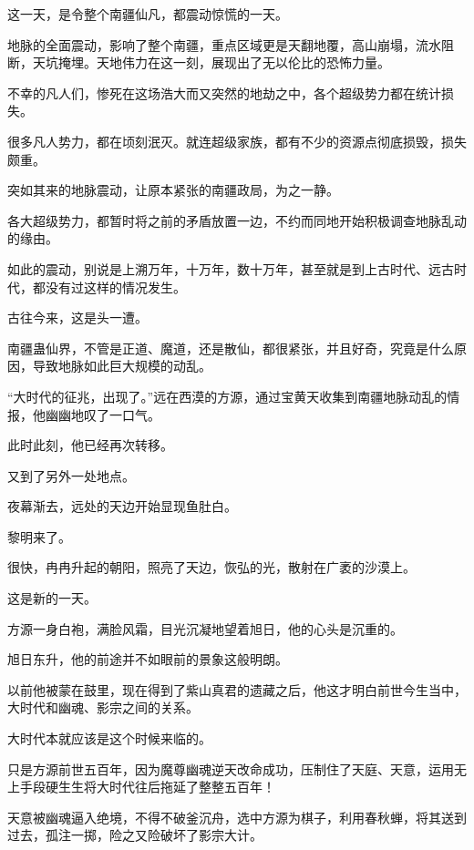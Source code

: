 
\begin{this_body}

这一天，是令整个南疆仙凡，都震动惊慌的一天。

地脉的全面震动，影响了整个南疆，重点区域更是天翻地覆，高山崩塌，流水阻断，天坑掩埋。天地伟力在这一刻，展现出了无以伦比的恐怖力量。

不幸的凡人们，惨死在这场浩大而又突然的地劫之中，各个超级势力都在统计损失。

很多凡人势力，都在顷刻泯灭。就连超级家族，都有不少的资源点彻底损毁，损失颇重。

突如其来的地脉震动，让原本紧张的南疆政局，为之一静。

各大超级势力，都暂时将之前的矛盾放置一边，不约而同地开始积极调查地脉乱动的缘由。

如此的震动，别说是上溯万年，十万年，数十万年，甚至就是到上古时代、远古时代，都没有过这样的情况发生。

古往今来，这是头一遭。

南疆蛊仙界，不管是正道、魔道，还是散仙，都很紧张，并且好奇，究竟是什么原因，导致地脉如此巨大规模的动乱。

“大时代的征兆，出现了。”远在西漠的方源，通过宝黄天收集到南疆地脉动乱的情报，他幽幽地叹了一口气。

此时此刻，他已经再次转移。

又到了另外一处地点。

夜幕渐去，远处的天边开始显现鱼肚白。

黎明来了。

很快，冉冉升起的朝阳，照亮了天边，恢弘的光，散射在广袤的沙漠上。

这是新的一天。

方源一身白袍，满脸风霜，目光沉凝地望着旭日，他的心头是沉重的。

旭日东升，他的前途并不如眼前的景象这般明朗。

以前他被蒙在鼓里，现在得到了紫山真君的遗藏之后，他这才明白前世今生当中，大时代和幽魂、影宗之间的关系。

大时代本就应该是这个时候来临的。

只是方源前世五百年，因为魔尊幽魂逆天改命成功，压制住了天庭、天意，运用无上手段硬生生将大时代往后拖延了整整五百年！

天意被幽魂逼入绝境，不得不破釜沉舟，选中方源为棋子，利用春秋蝉，将其送到过去，孤注一掷，险之又险破坏了影宗大计。


\end{this_body}
